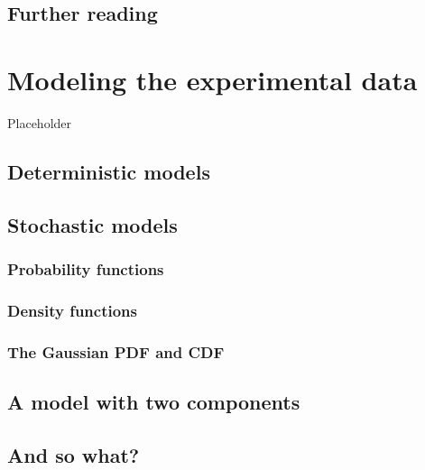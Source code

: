 \documentclass[a4paper,12pt,oneside]{book}
\begin{document}
\hypertarget{further-reading}{%
\section{Further reading}\label{further-reading}}

\hypertarget{modeling-the-experimental-data}{%
\chapter{Modeling the experimental data}\label{modeling-the-experimental-data}}

Placeholder

\hypertarget{deterministic-models}{%
\section{Deterministic models}\label{deterministic-models}}

\hypertarget{stochastic-models}{%
\section{Stochastic models}\label{stochastic-models}}

\hypertarget{probability-functions}{%
\subsection{Probability functions}\label{probability-functions}}

\hypertarget{density-functions}{%
\subsection{Density functions}\label{density-functions}}

\hypertarget{the-gaussian-pdf-and-cdf}{%
\subsection{The Gaussian PDF and CDF}\label{the-gaussian-pdf-and-cdf}}

\hypertarget{a-model-with-two-components}{%
\section{A model with two components}\label{a-model-with-two-components}}

\hypertarget{and-so-what}{%
\section{And so what?}\label{and-so-what}}
\end{document}
